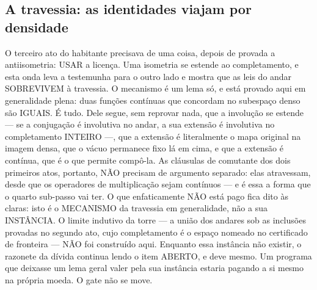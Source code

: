 \documentclass[11pt]{article}
\theoremstyle{definition}\newtheorem{deriv}{Derivação}
\begin{document}
\subsection*{A travessia: as identidades viajam por densidade}O terceiro ato do habitante precisava de uma coisa, depois de provada a antiisometria: USAR a licen\c{c}a. Uma isometria se estende ao completamento, e esta onda leva a testemunha para o outro lado e mostra que as leis do andar SOBREVIVEM \`a travessia. O mecanismo \'e um lema s\'o, e est\'a provado aqui em generalidade plena: duas fun\c{c}\~oes cont\'inuas que concordam no subespa\c{c}o denso s\~ao IGUAIS. \'E tudo. Dele segue, sem reprovar nada, que a involu\c{c}\~ao se estende --- se a conjuga\c{c}\~ao \'e involutiva no andar, a sua extens\~ao \'e involutiva no completamento INTEIRO ---, que a extens\~ao \'e literalmente o mapa original na imagem densa, que o v\'acuo permanece fixo l\'a em cima, e que a extens\~ao \'e cont\'inua, que \'e o que permite comp\^o-la. As cl\'ausulas de comutante dos dois primeiros atos, portanto, N\~AO precisam de argumento separado: elas atravessam, desde que os operadores de multiplica\c{c}\~ao sejam cont\'inuos --- e \'e essa a forma que o quarto sub-passo vai ter. O que enfaticamente N\~AO est\'a pago fica dito \`as claras: isto \'e o MECANISMO da travessia em generalidade, n\~ao a sua INST\^ANCIA. O limite indutivo da torre --- a uni\~ao dos andares sob as inclus\~oes provadas no segundo ato, cujo completamento \'e o espa\c{c}o nomeado no certificado de fronteira --- N\~AO foi constru\'ido aqui. Enquanto essa inst\^ancia n\~ao existir, o razonete da d\'ivida continua lendo o item ABERTO, e deve mesmo. Um programa que deixasse um lema geral valer pela sua inst\^ancia estaria pagando a si mesmo na pr\'opria moeda. O gate n\~ao se move.
\end{document}
